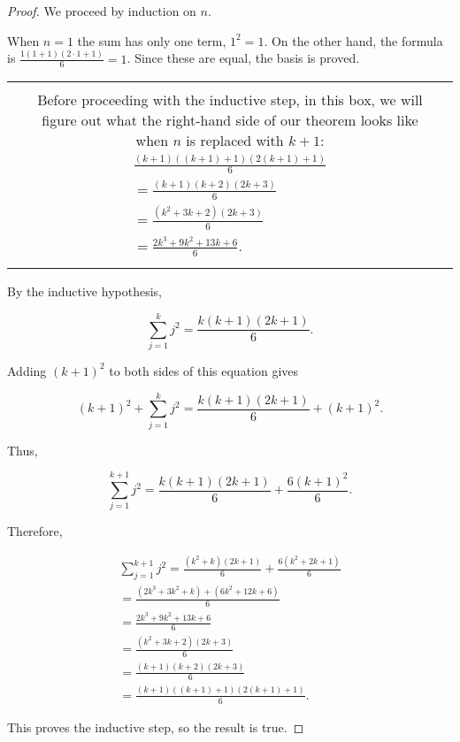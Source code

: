 \begin{proof}
We proceed by induction on $n$.

 When $n = 1$ the sum has only one term, $1^2 = 1$.
On the other hand, the formula is 
$\displaystyle \frac{1(1+1)(2\cdot 1+1)}{6} = 1$.  Since these are equal, the 
basis is proved.


\begin{tabular}{|ccc|} \hline
 & &\\
 & \begin{minipage}{4 in} 
Before proceeding with the inductive step, in this box, we will
figure out what the right-hand side of our theorem looks like 
when $n$ is replaced with $k+1$:
\begin{gather*}
 \frac{(k+1)((k+1)+1)(2(k+1)+1)}{6} \\
= \frac{(k+1)(k+2)(2k+3)}{6} \\
= \frac{(k^2+3k+2)(2k+3)}{6} \\
= \frac{2k^3+9k^2+13k+6}{6}.
\end{gather*}
\end{minipage} & \\ 
 & & \\ \hline
\end{tabular}


By the inductive hypothesis,

\[ \sum_{j=1}^k j^2 = \frac{k(k+1)(2k+1)}{6}. \]

Adding $(k+1)^2$ to both sides of this equation gives

\[ (k+1)^2 + \sum_{j=1}^k j^2 = \frac{k(k+1)(2k+1)}{6} + (k+1)^2. \]

Thus,

\[ \sum_{j=1}^{k+1} j^2 = \frac{k(k+1)(2k+1)}{6} + \frac{6(k+1)^2}{6}. \]

Therefore,

\begin{gather*}
\sum_{j=1}^{k+1} j^2 = \frac{(k^2+k)(2k+1)}{6} + \frac{6(k^2+2k+1)}{6} \\
 = \frac{(2k^3+3k^2+k)+(6k^2+12k+6)}{6}\\
 = \frac{2k^3+9k^2+13k+6}{6}\\
 = \frac{(k^2+3k+2)(2k+3)}{6}\\
 = \frac{(k+1)(k+2)(2k+3)}{6} \\
 = \frac{(k+1)((k+1)+1)(2(k+1)+1)}{6}.
\end{gather*}

This proves the inductive step, so the result is true.

\end{proof}

